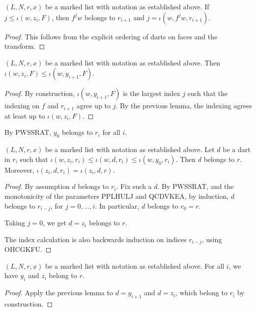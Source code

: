 \begin{lemma}
$(L,N,r,x)$ be a marked list with notation as established above.
If $j\le \iota(w,z_i,F)$, then $f^jw$ belongs to $r_{i+1}$ and
$j = \iota(w,f^j w,r_{i+1})$.
\end{lemma}

\begin{proof} This follows from the explicit ordering of darts on faces and the transform.
\end{proof}

\begin{lemma}
$(L,N,r,x)$ be a marked list with notation as established above.
Then $\iota(w,z_i,F) \le \iota(w,y_{i+1},F)$.
\end{lemma}

\begin{proof} By construction,  $\iota(w,y_{i+1},F)$ is the 
largest index $j$ such that the indexing on $f$ and $r_{i+1}$ agree up to $j$.
By the previous lemma, the indexing agrees at least up to $\iota(w,z_i,F)$.
\end{proof}

By PWSSRAT, $y_0$ belongs to $r_i$ for all $i$.

\begin{lemma}
$(L,N,r,x)$ be a marked list with notation as established above.
Let $d$ be a dart in $r_i$ such that
$\iota(w,z_i,r_i)\le \iota(w,d,r_i) \le \iota(w,y_0,r_i)$. Then $d$ belongs to $r$.
Moreover, $\iota(z_i,d,r_i) = \iota(z_i,d,r)$.
\end{lemma}

\begin{proof}
By assumption $d$ belongs to $r_i$.
Fix such a $d$.  By PWSSRAT, and the monotonicity of the parameters PPLHULJ and QCDVKEA,
by induction, $d$ belongs to $r_{i-j}$, for $j=0,\ldots,i$.  In particular, $d$ belongs to $r_0 = r$.

Taking $j=0$, we get $d=z_i$ belongs to $r$.

The index calculation is also backwards induction on indices $r_{i-j}$, using 
OHCGKFU.
\end{proof}

\begin{lemma}
$(L,N,r,x)$ be a marked list with notation as established above.
For all $i$, we have $y_i$ and $z_i$ belong to $r$.
\end{lemma}

\begin{proof}
Apply the previous lemma to $d = y_{i+1}$ and $d=z_i$, which belong to $r_i$ by construction.
\end{proof}

